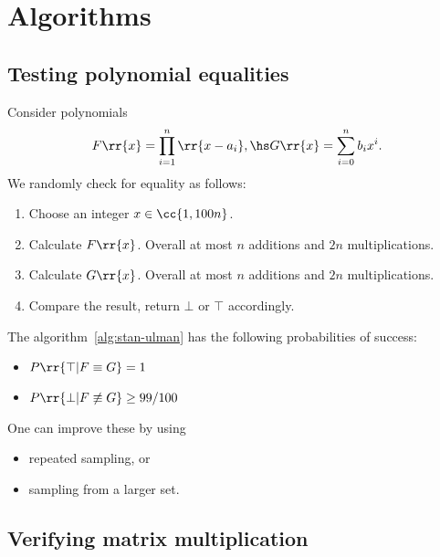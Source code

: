 \documentclass{article}
\begin{document}
\section{Algorithms}
\label{sec:algorithms}

\subsection{Testing polynomial equalities}

\begin{algorithm}\label{alg:stan-ulman}
  Consider polynomials
  \begin{align*}
    F \rr{ x } = \prod_{i=1}^n \rr{ x - a_i }, \hs G \rr{ x } = \sum_{ i=0 }^{ n } b_i x^i.
  \end{align*}
  We randomly check for equality as follows:
  \begin{enumerate}
    \item Choose an integer $x\in \cc{ 1, 100n }$.
    \item Calculate $F \rr{ x }$. Overall at most $n$ additions and $2n$ multiplications.
    \item Calculate $G \rr{ x }$. Overall at most $n$ additions and $2n$ multiplications.
    \item Compare the result, return $\bot$ or $\top$ accordingly.
  \end{enumerate}
\end{algorithm}


\begin{theorem}
  \label{thm:stan-ulman-probabilities}
  The algorithm~\ref{alg:stan-ulman} has the following probabilities of success:
  \begin{itemize}
    \item $P \rr{ \top | F\equiv G } = 1$
    \item $P \rr{ \bot | F\not\equiv G } \geq 99/100$
  \end{itemize}
  One can improve these by using
  \begin{itemize}
    \item repeated sampling, or
    \item sampling from a larger set.
  \end{itemize}
\end{theorem}

\subsection{Verifying matrix multiplication}
\end{document}

